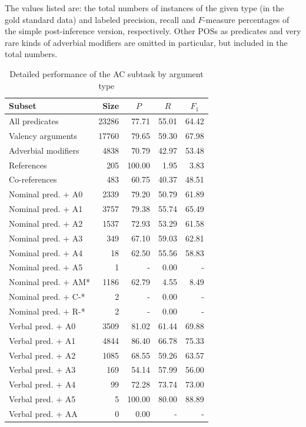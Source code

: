 \documentclass[12pt,notitlepage]{report}
\begin{document}
\begin{table}[p]\footnotesize
\caption{Detailed performance of the AC subtask by argument type}\label{tab:ac-output}
The values listed are: the total numbers of instances of the given type (in the gold standard data) and labeled precision, recall and $F$-measure percentages of the simple post-inference version, respectively. Other POSs as predicates and very rare kinds of adverbial modifiers are omitted in particular, but included in the total numbers.
\begin{center}
\begin{tabular}{|l|r|r|r|r|}\hline
\bf Subset & \bf Size & \multicolumn{1}{c|}{$P$} & \multicolumn{1}{c|}{$R$} & \multicolumn{1}{c|}{$F_1$} \\\hline\hline
All predicates & 23286 & 77.71 & 55.01 & 64.42 \\\hline
Valency arguments & 17760 & 79.65 & 59.30 & 67.98 \\
Adverbial modifiers & 4838 & 70.79 & 42.97 & 53.48 \\
References & 205 & 100.00 & 1.95 & 3.83 \\
Co-references & 483 & 60.75 & 40.37 & 48.51 \\\hline\hline
Nominal pred. + A0 & 2339 & 79.20 & 50.79 & 61.89 \\
Nominal pred. + A1 & 3757 & 79.38 & 55.74 & 65.49 \\
Nominal pred. + A2 & 1537 & 72.93 & 53.29 & 61.58 \\
Nominal pred. + A3 & 349 & 67.10 & 59.03 & 62.81 \\
Nominal pred. + A4 & 18 & 62.50 & 55.56 & 58.83 \\
Nominal pred. + A5 & 1 & - & 0.00 & - \\
Nominal pred. + AM* & 1186 & 62.79 & 4.55 & 8.49 \\
Nominal pred. + C-* & 2 & - & 0.00 & - \\
Nominal pred. + R-* & 2 & - & 0.00 & - \\
Verbal pred. + A0 & 3509 & 81.02 & 61.44 & 69.88 \\
Verbal pred. + A1 & 4844 & 86.40 & 66.78 & 75.33 \\
Verbal pred. + A2 & 1085 & 68.55 & 59.26 & 63.57 \\
Verbal pred. + A3 & 169 & 54.14 & 57.99 & 56.00 \\
Verbal pred. + A4 & 99 & 72.28 & 73.74 & 73.00 \\
Verbal pred. + A5 & 5 & 100.00 & 80.00 & 88.89 \\
Verbal pred. + AA & 0 & 0.00 & - & - \\

\end{tabular}
\end{center}
\end{table}
\end{document}
